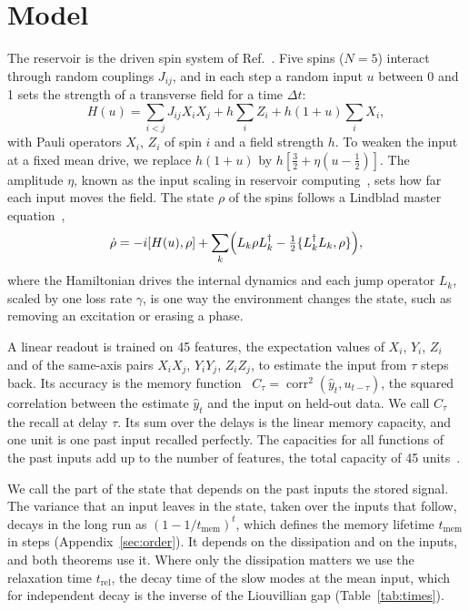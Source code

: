 \section{Model}
\label{sec:shapes}
The reservoir is the driven spin system of Ref.~\cite{Sannia2024}. Five spins ($N=5$) interact through random
couplings $J_{ij}$, and in each step a random input $u$ between 0 and 1 sets the strength of a transverse field for a
time $\Delta t$:
\begin{equation}
  H(u)=\sum_{i<j}J_{ij}X_iX_j+h\sum_iZ_i+h(1+u)\sum_iX_i ,
  \label{eq:H}
\end{equation}
with Pauli operators $X_i$, $Z_i$ of spin $i$ and a field strength $h$. To weaken the input at a fixed mean drive, we
replace $h(1+u)$ by $h[\tfrac32+\eta(u-\tfrac12)]$. The amplitude $\eta$, known as the input scaling in
reservoir computing~\cite{Jaeger2007Leaky}, sets how far each input moves the field. The state $\rho$ of the spins follows a Lindblad master
equation~\cite{Gorini1976,Lindblad1976},
\begin{equation}
  \dot\rho=-i[H(u),\rho]+\sum_k\Bigl(L_k\rho L_k^\dagger-\tfrac12\{L_k^\dagger L_k,\rho\}\Bigr),
  \label{eq:lindblad}
\end{equation}
where the Hamiltonian drives the internal dynamics and each jump operator $L_k$, scaled by one loss rate $\gamma$, is
one way the environment changes the state, such as removing an excitation or erasing a phase.

A linear readout is trained on 45 features, the expectation values of $X_i$, $Y_i$, $Z_i$ and of the same-axis pairs
$X_iX_j$, $Y_iY_j$, $Z_iZ_j$, to estimate the input from $\tau$ steps back. Its accuracy is the memory
function~\cite{White2004} $C_\tau=\operatorname{corr}^2(\hat y_t,u_{t-\tau})$, the squared correlation between the
estimate $\hat y_t$ and the input on held-out data. We call $C_\tau$ the recall at delay $\tau$. Its sum over the
delays is the linear memory capacity, and one unit is one past input recalled perfectly. The capacities for all
functions of the past inputs add up to the number of features, the total capacity of 45 units~\cite{Dambre2012}.

We call the part of the state that depends on the past inputs the stored signal. The variance that an input leaves in
the state, taken over the inputs that follow, decays in the long run as $(1-1/t_{\mathrm{mem}})^t$, which defines the
memory lifetime $t_{\mathrm{mem}}$ in steps (Appendix~\ref{sec:order}). It depends on the dissipation and on the
inputs, and both theorems use it. Where only the dissipation matters we use the relaxation time $t_{\mathrm{rel}}$,
the decay time of the slow modes at the mean input, which for independent decay is the inverse of the Liouvillian
gap (Table~\ref{tab:times}).

